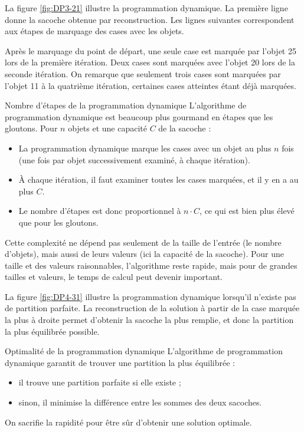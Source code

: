 \documentclass[a4paper,twoside]{article}
\begin{document}
  La figure \ref{fig:DP3-21} illustre la programmation dynamique.
  La première ligne donne la sacoche obtenue par reconstruction.
  Les lignes suivantes correspondent aux étapes de marquage des cases avec les objets.

  Après le marquage du point de départ, une seule case est marquée par l'objet 25 lors de la première itération.
  Deux cases sont marquées avec l'objet 20 lors de la seconde itération.
  On remarque que seulement trois cases sont marquées par l'objet 11 à la quatrième itération, certaines cases atteintes étant déjà marquées.

  \begin{remarque}{Nombre d'étapes de la programmation dynamique}
    L'algorithme de programmation dynamique est beaucoup plus gourmand en étapes que les gloutons.
    Pour $n$ objets et une capacité $C$ de la sacoche :
    \begin{itemize}
    \item La programmation dynamique marque les cases avec un objet au plus $n$ fois (une fois par objet successivement examiné, à chaque itération).
    \item À chaque itération, il faut examiner toutes les cases marquées, et il y en a au plus $C$.
    \item Le nombre d'étapes est donc proportionnel à $n \cdot C$, ce qui est bien plus élevé que pour les gloutons.
    \end{itemize}

    Cette complexité ne dépend pas seulement de la taille de l'entrée (le nombre d'objets),
    mais aussi de leurs valeurs (ici la capacité de la sacoche).
    Pour une taille et des valeurs raisonnables, l'algorithme reste rapide,
    mais pour de grandes tailles et valeurs, le temps de calcul peut devenir important.
  \end{remarque}


  

  La figure \ref{fig:DP4-31} illustre la programmation dynamique lorsqu'il n'existe pas de partition parfaite.
  La reconstruction de la solution à partir de la case marquée la plus à droite permet d'obtenir la sacoche la plus remplie, et donc la partition la plus équilibrée possible.



\begin{remarque}{Optimalité de la programmation dynamique}
  L'algorithme de programmation dynamique garantit de trouver une partition la plus équilibrée :
  \begin{itemize}
  \item il trouve une partition parfaite si elle existe ;
  \item sinon, il minimise la différence entre les sommes des deux sacoches.
  \end{itemize}
    On sacrifie la rapidité pour être sûr d'obtenir une solution optimale.
  \end{remarque}
\end{document}
